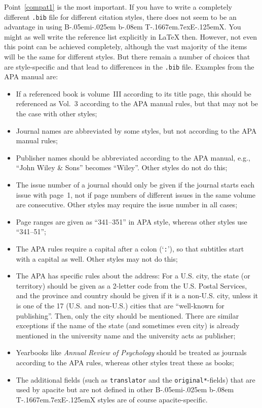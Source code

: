 \documentclass{article}
\def\BibTeX{{\rm B\kern-.05em{\sc i\kern-.025em b}\kern-.08em
    T\kern-.1667em\lower.7ex\hbox{E}\kern-.125emX}}%
\newcommand{\pkg}[1]{\textsf{#1}}%
\newcommand{\fname}[1]{\texttt{#1}}%
\newcommand{\fieldname}[1]{\texttt{#1}}%
\begin{document}
Point~\ref{compat1} is the most important. If you have to write a completely
different \fname{.bib} file for different citation styles, there does not seem
to be an advantage in using \BibTeX{}. You might as well write the reference
list explicitly in \LaTeX{} then. However, not even this point can be achieved
completely, although the vast majority of the items will be the same for
different styles. But there remain a number of choices that are style-specific
and that lead to differences in the \fname{.bib} file. Examples from the APA
manual are:
\begin{itemize}
\item If a referenced book is volume~III according to its title
      page, this should be referenced as Vol.~3 according to the
      APA manual rules, but that may not be the case with other
      styles;
\item Journal names are abbreviated by some styles, but not
      according to the APA manual rules;
\item Publisher names should be abbreviated according to the
      APA manual, e.g., ``John Wiley \& Sons'' becomes ``Wiley''.
      Other styles do not do this;
\item The issue number of a journal should only be given if
      the journal starts each issue with page~1, not if page
      numbers of different issues in the same volume are consecutive.
      Other styles may require the issue number in all cases;
\item Page ranges are given as ``341--351'' in APA style, whereas
      other styles use ``341--51'';
\item The APA rules require a capital after a colon (`\verb+:+'),
      so that subtitles start with a capital as well. Other styles
      may not do this;
\item The APA has specific rules about the address: For a U.S. city,
      the state (or territory) should be given as a 2-letter code
      from the U.S. Postal Services, and the province and country
      should be given if it is a non-U.S. city, unless it is one of
      the 17 (U.S. and non-U.S.) cities that are ``well-known for
      publishing''. Then, only the city should be mentioned. There
      are similar exceptions if the name of the state (and sometimes
      even city) is already mentioned in the university name and
      the university acts as publisher;
\item Yearbooks like \emph{Annual Review of Psychology} should be treated
      as journals according to the APA rules, whereas other styles
      treat these as books;
\item The additional fields (such as \fieldname{translator} and the
      \fieldname{original*}-fields) that are used by \pkg{apacite} but are
      not defined in other \BibTeX{} styles are of course
      \pkg{apacite}-specific.
\end{itemize}
\end{document}
